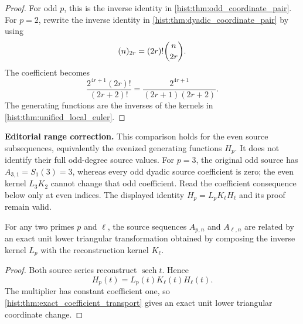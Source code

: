 \begin{proof}
For odd \(p\), this is the inverse identity in \cref{hist:thm:odd_coordinate_pair}. For \(p=2\), rewrite the inverse identity in \cref{hist:thm:dyadic_coordinate_pair} by using
\[
(n)_{2r}=(2r)!\binom n{2r}.
\]
The coefficient becomes
\[
\frac{2^{4r+1}(2r)!}{(2r+2)!}
=
\frac{2^{4r+1}}{(2r+1)(2r+2)}.
\]
The generating functions are the inverses of the kernels in \cref{hist:thm:unified_local_euler}.
\end{proof}

\begin{histcorollary}\label{hist:cor:local_source_change}
\par\noindent\textbf{Editorial range correction.} This comparison holds for the even source subsequences, equivalently the evenized generating functions $H_p$. It does not identify their full odd-degree source values. For $p=3$, the original odd source has $A_{3,1}=S_1(3)=3$, whereas every odd dyadic source coefficient is zero; the even kernel $L_3K_2$ cannot change that odd coefficient. Read the coefficient consequence below only at even indices. The displayed identity $H_p=L_pK_\ell H_\ell$ and its proof remain valid.\par\medskip
For any two primes \(p\) and \(\ell\), the source sequences \(A_{p,n}\) and \(A_{\ell,n}\) are related by an exact unit lower triangular transformation obtained by composing the inverse kernel \(L_p\) with the reconstruction kernel \(K_\ell\).
\end{histcorollary}

\begin{proof}
Both source series reconstruct \(\operatorname{sech}t\). Hence
\[
H_p(t)=L_p(t)K_\ell(t)H_\ell(t).
\]
The multiplier has constant coefficient one, so \cref{hist:thm:exact_coefficient_transport} gives an exact unit lower triangular coordinate change.
\end{proof}

